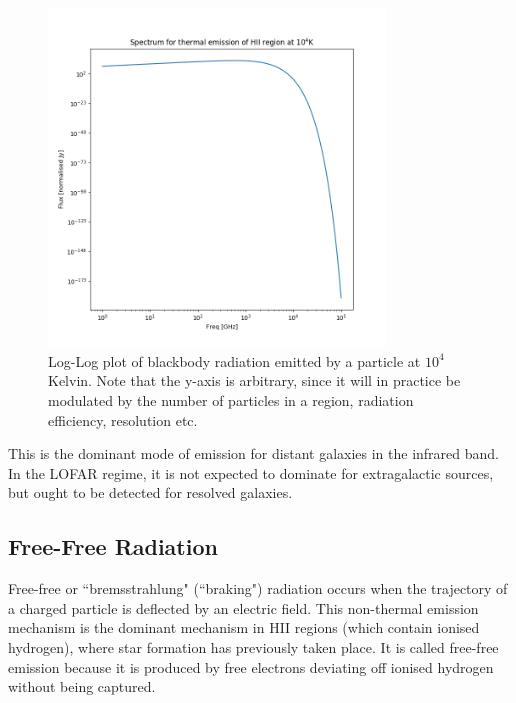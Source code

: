 \begin{figure}[!h]
\centering
\includegraphics[width=0.8\textwidth]{images/ThermalEmission.png}
\caption{\label{plot.thermal}Log-Log plot of blackbody radiation emitted by a particle at $10^4$ Kelvin. Note that the y-axis is arbitrary, since it will in practice be modulated by the number of particles in a region, radiation efficiency, resolution etc.}
\end{figure}
\pg
This is the dominant mode of emission for distant galaxies in the infrared band. In the LOFAR regime, it is not expected to dominate for extragalactic sources, but ought to be detected for resolved galaxies.

\subsection{Free-Free Radiation}
\pg
Free-free or ``bremsstrahlung" (``braking") radiation occurs when the trajectory of a charged particle is deflected by an electric field. This non-thermal emission mechanism is the dominant mechanism in HII regions (which contain ionised hydrogen), where star formation has previously taken place. It is called free-free emission because it is produced by free electrons deviating off ionised hydrogen without being captured. %

